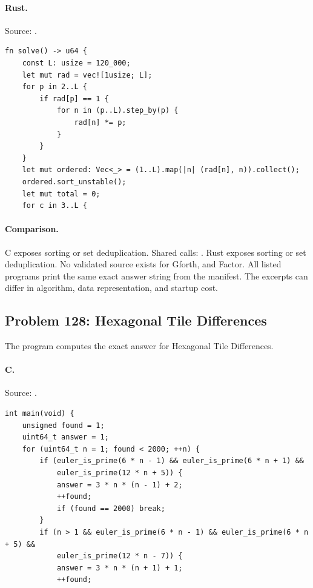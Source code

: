 \paragraph{Rust.} Source: .
\begin{lstlisting}
fn solve() -> u64 {
    const L: usize = 120_000;
    let mut rad = vec![1usize; L];
    for p in 2..L {
        if rad[p] == 1 {
            for n in (p..L).step_by(p) {
                rad[n] *= p;
            }
        }
    }
    let mut ordered: Vec<_> = (1..L).map(|n| (rad[n], n)).collect();
    ordered.sort_unstable();
    let mut total = 0;
    for c in 3..L {
\end{lstlisting}

\paragraph{Comparison.}
C exposes sorting or set deduplication. Shared calls: \texttt{}. Rust exposes sorting or set deduplication.
No validated source exists for Gforth, and Factor.
All listed programs print the same exact answer string from the manifest. The excerpts can differ in algorithm, data representation, and startup cost.

\subsection{Problem 128: Hexagonal Tile Differences}
\label{walkthrough:p128}
The program computes the exact answer for Hexagonal Tile Differences.

\paragraph{C.} Source: .
\begin{lstlisting}
int main(void) {
    unsigned found = 1;
    uint64_t answer = 1;
    for (uint64_t n = 1; found < 2000; ++n) {
        if (euler_is_prime(6 * n - 1) && euler_is_prime(6 * n + 1) &&
            euler_is_prime(12 * n + 5)) {
            answer = 3 * n * (n - 1) + 2;
            ++found;
            if (found == 2000) break;
        }
        if (n > 1 && euler_is_prime(6 * n - 1) && euler_is_prime(6 * n + 5) &&
            euler_is_prime(12 * n - 7)) {
            answer = 3 * n * (n + 1) + 1;
            ++found;
\end{lstlisting}

